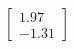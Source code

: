 \documentclass[preview]{standalone}
\begin{document}
\begin{align*}
\begin{bmatrix} 1.97 \\ -1.31 \end{bmatrix}
\end{align*}
\end{document}
